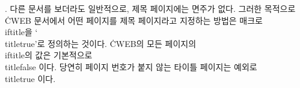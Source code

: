 {%
%
. 다른 문서를 보더라도 일반적으로, 제목 페이지에는 면주가 없다. 그러한
목적으로 \.{CWEB} 문서에서 어떤 페이지를 제목 페이지라고 지정하는 방법은 매크로
\.{\\iftitle}을 `\.{\\titletrue}'로 정의하는 것이다. \.{CWEB}의 모든 페이지의
\.{\\iftitle}의 값은 기본적으로 \.{\\titlefalse} 이다. 당연히 페이지 번호가 붙지
않는 타이틀 페이지는 예외로 \.{\\titletrue} 이다.

}
